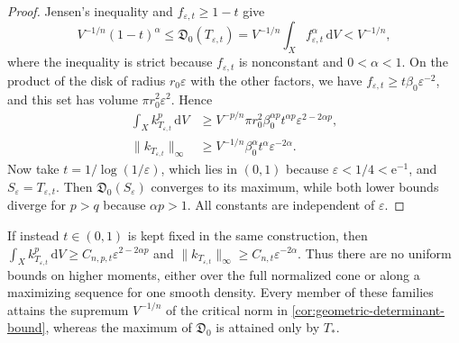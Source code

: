 \begin{proof}
Jensen's inequality and $f_{\varepsilon,t}\geq1-t$ give
\[
 V^{-1/n}(1-t)^\alpha
 \leq\mathfrak D_0(T_{\varepsilon,t})
 =V^{-1/n}\int_Xf_{\varepsilon,t}^{\alpha}\,\mathrm{d}V
 <V^{-1/n},
\]
where the inequality is strict because $f_{\varepsilon,t}$ is nonconstant and $0<\alpha<1$.
On the product of the disk of radius $r_0\varepsilon$ with the other factors, we have
$f_{\varepsilon,t}\geq t\beta_0\varepsilon^{-2}$, and this set has volume $\pi r_0^2\varepsilon^2$. Hence
\[
 \begin{split}
 \int_Xk_{T_{\varepsilon,t}}^p\,\mathrm{d}V
   &\geq V^{-p/n}\pi r_0^2\beta_0^{\alpha p}t^{\alpha p}
                    \varepsilon^{2-2\alpha p},\\
 \|k_{T_{\varepsilon,t}}\|_\infty
   &\geq V^{-1/n}\beta_0^\alpha t^\alpha\varepsilon^{-2\alpha}.
 \end{split}
\]
Now take $t=1/\log(1/\varepsilon)$, which lies in $(0,1)$ because $\varepsilon<1/4<\mathrm e^{-1}$, and $S_\varepsilon=T_{\varepsilon,t}$. Then $\mathfrak D_0(S_\varepsilon)$ converges to its maximum, while both lower bounds diverge for $p>q$ because $\alpha p>1$. All constants are independent of $\varepsilon$.
\end{proof}

If instead $t\in(0,1)$ is kept fixed in the same construction, then
$\int_Xk_{T_{\varepsilon,t}}^p\,\mathrm{d}V\geq C_{n,p,t}\varepsilon^{2-2\alpha p}$ and
$\|k_{T_{\varepsilon,t}}\|_\infty\geq C_{n,t}\varepsilon^{-2\alpha}$.
Thus there are no uniform bounds on higher moments, either over the full normalized cone or along a maximizing sequence for one smooth density. Every member of these families attains the supremum $V^{-1/n}$ of the critical norm in \cref{cor:geometric-determinant-bound}, whereas the maximum of $\mathfrak D_0$ is attained only by $T_*$.
